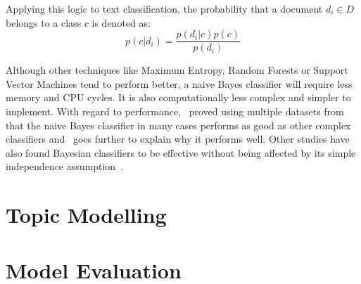 Applying this logic to text classification, the probability that a document $d_i \in D$ belongs to a
class $c$ is denoted as:
\begin{equation}
  p(c|d_i) = \frac{p(d_i|c)p(c)}{p(d_i)}
\end{equation}

Although other techniques like Maximum Entropy, Random Forests or Support Vector Machines tend to
perform better, a naive Bayes classifier will require less memory and CPU cycles. It is also
computationally less complex and simpler to implement. With regard to
performance,~\cite{huangLuLing2003} proved using multiple datasets from~\cite{blakeMerz1998} that
the naive Bayes classifier in many cases performs as good as other complex
classifiers and~\cite{zhang2004} goes further to explain why it performs well. Other studies have also
found Bayesian classifiers to be effective without being affected by its simple independence
assumption~\cite{langley1992analysis,manning2008}.

\section{Topic Modelling}
\label{sec:bg_topic_modelling}


\section{Model Evaluation}
\label{sec:bg_model_evaluation}

